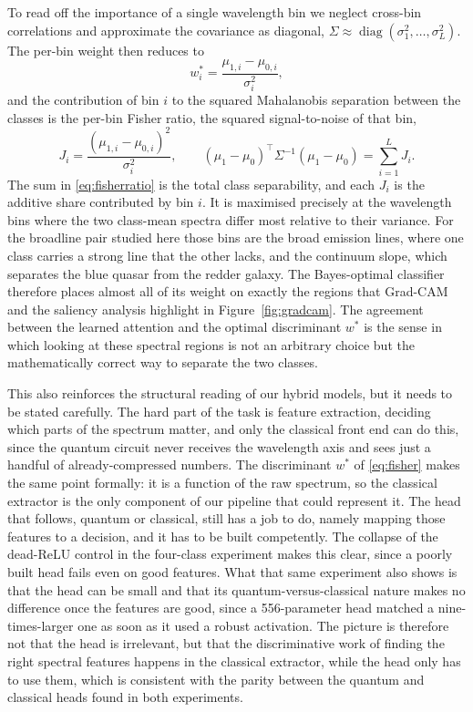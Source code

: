 To read off the importance of a single wavelength bin we neglect cross-bin
correlations and approximate the covariance as diagonal,
$\Sigma \approx \operatorname{diag}(\sigma_1^2, \dots, \sigma_L^2)$. The per-bin weight
then reduces to
\begin{equation}
    w^{\ast}_i = \frac{\mu_{1,i} - \mu_{0,i}}{\sigma_i^2},
    \label{eq:weight}
\end{equation}
and the contribution of bin $i$ to the squared Mahalanobis separation between the
classes is the per-bin Fisher ratio, the squared signal-to-noise of that bin,
\begin{equation}
    J_i = \frac{(\mu_{1,i} - \mu_{0,i})^2}{\sigma_i^2},
    \qquad
    (\mu_1 - \mu_0)^{\top}\Sigma^{-1}(\mu_1 - \mu_0) = \sum_{i=1}^{L} J_i .
    \label{eq:fisherratio}
\end{equation}
The sum in \eqref{eq:fisherratio} is the total class separability, and each $J_i$ is
the additive share contributed by bin $i$. It is maximised precisely at the wavelength
bins where the two class-mean spectra differ most relative to their variance. For the
broadline pair studied here those bins are the broad emission lines, where one class
carries a strong line that the other lacks, and the continuum slope, which separates
the blue quasar from the redder galaxy. The Bayes-optimal classifier therefore places
almost all of its weight on exactly the regions that Grad-CAM and the saliency analysis
highlight in Figure~\ref{fig:gradcam}. The agreement between the learned attention and
the optimal discriminant $w^{\ast}$ is the sense in which looking at these spectral
regions is not an arbitrary choice but the mathematically correct way to separate the
two classes.

This also reinforces the structural reading of our hybrid models, but it needs to be
stated carefully. The hard part of the task is feature extraction, deciding which
parts of the spectrum matter, and only the classical front end can do this, since the
quantum circuit never receives the wavelength axis and sees just a handful of
already-compressed numbers. The discriminant $w^{\ast}$ of \eqref{eq:fisher} makes
the same point formally: it is a function of the raw spectrum, so the classical
extractor is the only component of our pipeline that could represent it. The head that follows, quantum or classical, still has a
job to do, namely mapping those features to a decision, and it has to be built
competently. The collapse of the dead-ReLU control in the four-class
experiment makes this clear, since a poorly built head fails even on good features. What that same experiment also
shows is that the head can be small and that its quantum-versus-classical nature makes
no difference once the features are good, since a 556-parameter head matched a
nine-times-larger one as soon as it used a robust activation. The picture is therefore
not that the head is irrelevant, but that the discriminative work of finding the right
spectral features happens in the classical extractor, while the head only has to use
them, which is consistent with the parity between the quantum and classical heads found
in both experiments.

